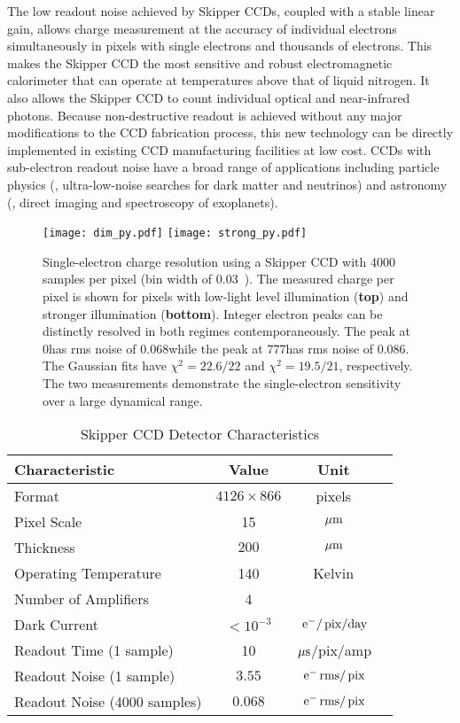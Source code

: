 \documentclass[aps,prl,reprint,superscriptaddress,floatfix,nofootinbib,showkeys,showpacs,preprintnumbers]{revtex4-1}
\begin{document}
The low readout noise achieved by Skipper CCDs, coupled with a stable linear gain, allows charge measurement at the accuracy of individual electrons simultaneously in pixels with single electrons and thousands of electrons.
This makes the Skipper CCD the most sensitive and robust electromagnetic calorimeter that can operate at temperatures above that of liquid nitrogen.
It also allows the Skipper CCD to count individual optical and near-infrared photons.
Because non-destructive readout is achieved without any major modifications to the CCD fabrication process, this new technology can be directly implemented in existing CCD manufacturing facilities at low cost.
CCDs with sub-electron readout noise have a broad range of applications including particle physics (\eg, ultra-low-noise searches for dark matter and neutrinos) and astronomy (\eg, direct imaging and spectroscopy of exoplanets).


\begin{figure}[!t]
\centering
\texttt{[image: dim\_py.pdf]}
\texttt{[image: strong\_py.pdf]}
\caption{
Single-electron charge resolution using a Skipper CCD with 4000 samples per pixel (bin width of 0.03~\e). 
The measured charge per pixel is shown for pixels with low-light level illumination ({\bf top}) and stronger illumination ({\bf bottom}).
Integer electron peaks can be distinctly resolved in both regimes contemporaneously.
The peak at 0\e has rms noise of 0.068\ermspix while the peak at 777\e has rms noise of 0.086\ermspix. 
The Gaussian fits have $\chi^2 = 22.6/22$ and $\chi^2 = 19.5/21$, respectively.  The two measurements demonstrate the single-electron sensitivity over a large dynamical range.
}
\label{fig:spectra}
\end{figure}


\begin{table}
\centering
\caption{\label{tab:skipper}
Skipper CCD Detector Characteristics
}
\begin{tabular}{l c c c}
\hline
Characteristic  & Value  & Unit\\
\hline \hline
Format & $4126 \times 866$ & pixels\\
Pixel Scale & 15 & $\mathrm{\,\mu m}$ \\
Thickness & $200$ & $\mathrm{\,\mu m}$\\
Operating Temperature & 140 & Kelvin \\
Number of Amplifiers & 4 & \\
Dark Current\footnotemark[1] & $< 10^{-3}$ & $\mathrm{\,e^{-}}/\mathrm{\,pix}/{\rm day}$ \\
Readout Time (1 sample) & 10 & $\mathrm{\,\mu s}$/pix/amp \\
Readout Noise (1 sample) & $3.55 $ & $\mathrm{\,e^{-}} \mathrm{\,rms}/\mathrm{\,pix}$ \\
Readout Noise (4000 samples) & $0.068$ & $\mathrm{\,e^{-}} \mathrm{\,rms}/\mathrm{\,pix}$ \\
\hline
\end{tabular}
\end{table}
\end{document}
